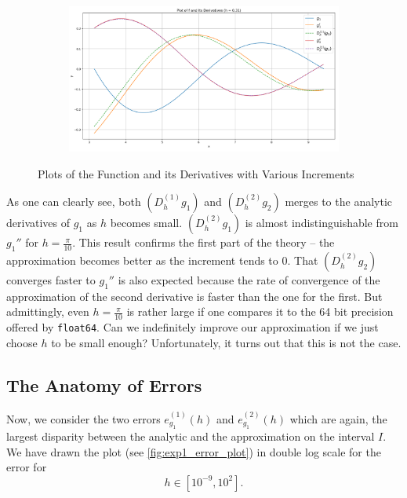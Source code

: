 \begin{figure}[h!]
\begin{subfigure}[b]{0.49\linewidth}
    \end{subfigure}
    \begin{subfigure}[b]{0.49\linewidth}
        \includegraphics[width=\linewidth]{graphics/plot_h/exp1_tiny_h.png}
    \end{subfigure}
    \caption{Plots of the Function and its Derivatives with Various Increments}
    \label{fig:exp1_h}
\end{figure}

As one can clearly see, both \((D^{(1)}_h g_1)\) and \((D^{(2)}_hg_2)\) merges to the analytic derivatives of \(g_1\) as \(h\) becomes small. \((D^{(2)}_h g_1)\) is almost indistinguishable from \(g_1''\) for \(h = \frac{\pi}{10}\). This result confirms the first part of the theory -- the approximation becomes better as the increment tends to \(0\). That \((D^{(2)}_h g_2)\) converges faster to \(g_1''\) is also expected because the rate of convergence of the approximation of the second derivative is faster than the one for the first. But admittingly, even \(h = \frac{\pi}{10}\) is rather large if one compares it to the 64 bit precision offered by \texttt{float64}. Can we indefinitely improve our approximation if we just choose \(h\) to be small enough? Unfortunately, it turns out that this is not the case.

\subsection{The Anatomy of Errors}\label{cha:error}

Now, we consider the two errors \(e_{g_1}^{(1)}(h)\) and \(e_{g_1}^{(2)}(h)\) which are again, the largest disparity between the analytic and the approximation on the interval \(I\). We have drawn the plot (see \ref{fig:exp1_error_plot}) in double log scale for the error for
\[h \in [10^{-9}, 10^2] \text{.} \]

